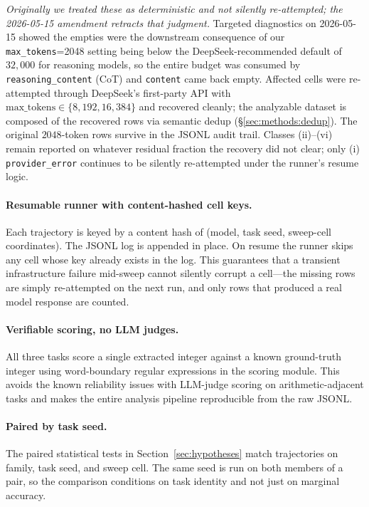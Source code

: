 \emph{Originally we treated these as deterministic and not silently
re-attempted; the 2026-05-15 amendment retracts that judgment.}
Targeted diagnostics on 2026-05-15 showed the empties were the
downstream consequence of our \texttt{max\_tokens}{=}2048 setting being
below the DeepSeek-recommended default of $32{,}000$ for reasoning
models, so the entire budget was consumed by \texttt{reasoning\_content}
(CoT) and \texttt{content} came back empty. Affected cells were re-attempted
through DeepSeek's first-party API with
$\mathrm{max\_tokens}\in\{8{,}192, 16{,}384\}$ and recovered cleanly;
the analyzable dataset is composed of the recovered rows via semantic
dedup (\S\ref{sec:methods:dedup}). The original $2048$-token rows
survive in the JSONL audit trail. Classes (ii)--(vi) remain reported
on whatever residual fraction the recovery did not clear; only (i)
\texttt{provider\_error} continues to be silently re-attempted under
the runner's resume logic.

\paragraph{Resumable runner with content-hashed cell keys.}
Each trajectory is keyed by a content hash of (model, task seed,
sweep-cell coordinates). The JSONL log is appended in place. On resume
the runner skips any cell whose key already exists in the log. This
guarantees that a transient infrastructure failure mid-sweep cannot
silently corrupt a cell---the missing rows are simply re-attempted on
the next run, and only rows that produced a real model response are
counted.

\paragraph{Verifiable scoring, no LLM judges.}
All three tasks score a single extracted integer against a known
ground-truth integer using word-boundary regular expressions in the
scoring module. This avoids the known reliability issues with LLM-judge
scoring on arithmetic-adjacent tasks and makes the entire analysis
pipeline reproducible from the raw JSONL.

\paragraph{Paired by task seed.}
The paired statistical tests in Section~\ref{sec:hypotheses} match
trajectories on family, task seed, and sweep cell. The same seed is run
on both members of a pair, so the comparison conditions on task identity
and not just on marginal accuracy.
